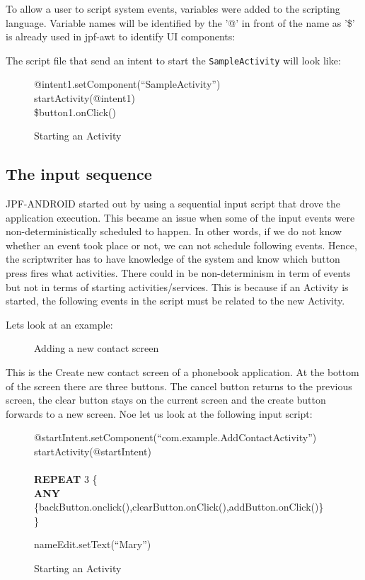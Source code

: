 \documentclass{acm_proc_article-sp}
\begin{document}
To allow a user to script system events, variables were added to the scripting language. Variable names will be identified by
the '@' in front of the name as '\$' is already used in jpf-awt to identify UI components:

The script file that send an intent to start the \texttt{SampleActivity} will look like:
\begin{figure}
{\small
{\sf 
@intent1.setComponent(``SampleActivity'')\\
startActivity(@intent1)\\
\$button1.onClick()
}
}
\caption{Starting an Activity}
\end{figure}










\subsection{The input sequence}
JPF-ANDROID started out by using a sequential input script that drove the application execution. This became an issue when some of the
input events were non-deterministically scheduled to happen. In other words, if we do not know whether an event took place or
not, we can not schedule following events. Hence, the scriptwriter has to have knowledge of the system and
know which button press fires what activities. There could in be non-determinism in term of events but not in terms of starting
activities/services. This is because if an Activity is started, the following events in the script must be related to the new Activity. 

Lets look at an example:
\begin{figure}
\centering
{}
\caption{Adding a new contact screen}
\end{figure}

This is the Create new contact screen of a phonebook application. At the bottom of the screen there are three buttons. The cancel button
returns to the previous screen, the clear button stays on the current screen and the create button forwards to a new screen. Noe  let us
look at the following input script:

\begin{figure}
{\small
{\sf 
@startIntent.setComponent(``com.example.AddContactActivity'')\\
startActivity(@startIntent)\\
\\
\textbf{REPEAT} 3 \{\\
\textbf{ANY} \{backButton.onclick(),clearButton.onClick(),addButton.onClick()\}\\
\}

nameEdit.setText(``Mary'')
}
}
\caption{Starting an Activity}
\end{figure}
\end{document}
